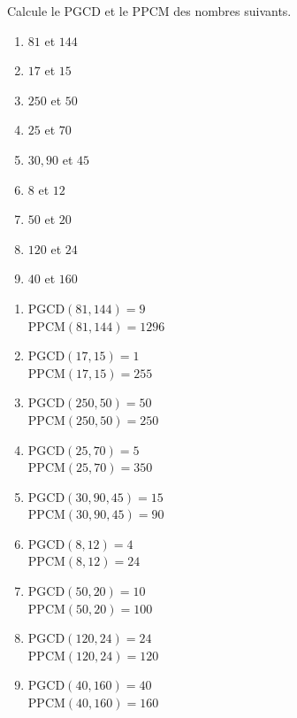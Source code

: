 \begin{exercise}
  Calcule le PGCD et le PPCM des nombres suivants.
  \begin{enumerate}[cols=3]
    \item $81$ et $144$
    \item $17$ et $15$
    \item $250$ et $50$
    \item $25$ et $70$
    \item $30,90$ et $45$
    \item $8$ et $12$
    \item $50$ et $20$
    \item $120$ et $24$
    \item $40$ et $160$
  \end{enumerate}
\end{exercise}
\begin{solution}
  \begin{enumerate}[cols=2]
    \item $\mathrm{PGCD}(81,144)=9$\\$\mathrm{PPCM}(81,144)=\num{1296}$
    \item $\mathrm{PGCD}(17,15)=1$\\$\mathrm{PPCM}(17,15)=\num{255}$
    \item $\mathrm{PGCD}(250,50)=50$\\$\mathrm{PPCM}(250,50)=\num{250}$
    \item $\mathrm{PGCD}(25,70)=5$\\$\mathrm{PPCM}(25,70)=\num{350}$
    \item $\mathrm{PGCD}(30,90,45)=15$\\$\mathrm{PPCM}(30,90,45)=\num{90}$
    \item $\mathrm{PGCD}(8,12)=4$\\$\mathrm{PPCM}(8,12)=\num{24}$
    \item $\mathrm{PGCD}(50,20)=10$\\$\mathrm{PPCM}(50,20)=\num{100}$
    \item $\mathrm{PGCD}(120,24)=24$\\$\mathrm{PPCM}(120,24)=\num{120}$
    \item $\mathrm{PGCD}(40,160)=40$\\$\mathrm{PPCM}(40,160)=\num{160}$
  \end{enumerate}
\end{solution}

